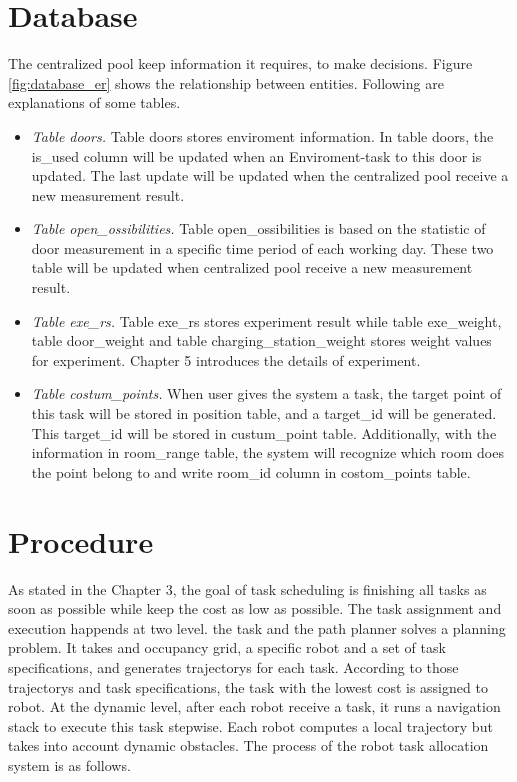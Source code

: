 \section{Database}
The centralized pool keep information it requires, to make decisions. Figure \ref{fig:database_er} shows the relationship between entities. Following are explanations of some tables.
\begin{itemize}
	\item \textsl{Table doors.} Table doors stores enviroment information. In table doors, the is\_used column will be updated when an Enviroment-task to this door is updated. The last update will be updated when the centralized pool receive a new measurement result. 
	\item \textsl{Table open\_ossibilities.} Table open\_ossibilities is based on the statistic of door measurement in a specific time period of each working day. These two table will be updated when centralized pool receive a new measurement result. 
	\item \textsl{Table exe\_rs.} Table exe\_rs stores experiment result while table exe\_weight, table door\_weight and table charging\_station\_weight stores weight values for experiment. Chapter 5 introduces the details of experiment.
	\item \textsl{Table costum\_points.} When user gives the system a task, the target point of this task will be stored in position table, and a target\_id will be generated.  This target\_id will be stored in custum\_point table. 	Additionally, with the information in room\_range table, the system will recognize which room does the point belong to and write room\_id column in costom\_points table.
\end{itemize}


\section{Procedure}
As stated in the Chapter 3, the goal of task scheduling is finishing all tasks as soon as possible while keep the cost as low as possible. 
The task assignment and execution happends at two level. \cite{Ivan2017} the task and the path planner solves a planning problem. It takes and occupancy grid, a specific robot and a set of task specifications, and generates trajectorys for each task. According to those trajectorys and task specifications, the task with the lowest cost is assigned to robot.
At the dynamic level, after each robot receive a task, it runs a navigation stack to execute this task stepwise. Each robot computes a local trajectory but takes into account dynamic obstacles.
The process of the robot task allocation system is as follows.


